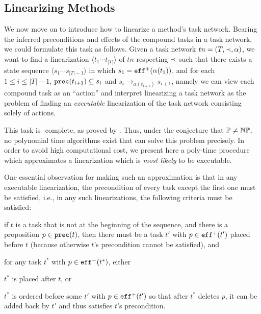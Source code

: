 \subsection{Linearizing Methods}

We now move on to introduce how to linearize a method's task network. Bearing the inferred preconditions and effects of the compound tasks in a task network, we could formulate this task as follows. Given a task network $tn = (T, \mathord{\prec}{}, \alpha)$, we want to find a linearization $\langle t_{1} \cdots t_{|T|} \rangle$ of $tn$ respecting $\mathord{\prec}{}$ such that there exists a state sequence $\langle s_{1} \cdots s_{|T| - 1} \rangle$ in which $s_{1} = \mathtt{eff}^{+}(\alpha(t_{1}))$, and for each $1 \leq i \leq |T| - 1$, $\mathtt{prec}(t_{i + 1}) \subseteq s_{i}$ and $s_{i} \to_{\alpha(t_{i + 1})} s_{i + 1}$, namely we can view each compound task as an ``action'' and interpret linearizing a task network as the problem of finding an \emph{executable} linearization of the task network consisting solely of actions.

This task is \NP{}-complete, as proved by . Thus, under the conjecture that $\mathbb{P}{} \neq \mathbb{NP}{}$, no polynomial time algorithms exist that can solve this problem precisely. In order to avoid high computational cost, we present here a poly-time procedure which approximates a linearization which is \emph{most likely} to be executable.

One essential observation for making such an approximation is that in any executable linearization, the precondition of every task except the first one must be satisfied, i.e., in any such linearizations, the following criteria must be satisfied: 
\begin{compactenum}[1)]
    \item if $t$ is a task that is not at the beginning of the sequence, and there is a proposition $p \in \mathtt{prec}(t)$, then there must be a task $t'$ with $p \in \mathtt{eff}^{+}(t')$ placed before $t$ (because otherwise $t$'s precondition cannot be satisfied), and 
    \item for any task $t^{\ast}$ with $p \in \mathtt{eff}^{-}(t^{\ast})$, either
    \begin{compactenum}[a)]
        \item $t^{\ast}$ is placed after $t$, or
        \item $t^{\ast}$ is ordered before some $t'$ with $p \in \mathtt{eff}^{+}(t')$ so that after $t^{\ast}$ deletes $p$, it can be added back by $t'$ and thus satisfies $t$'s precondition. %
    \end{compactenum}
\end{compactenum}

